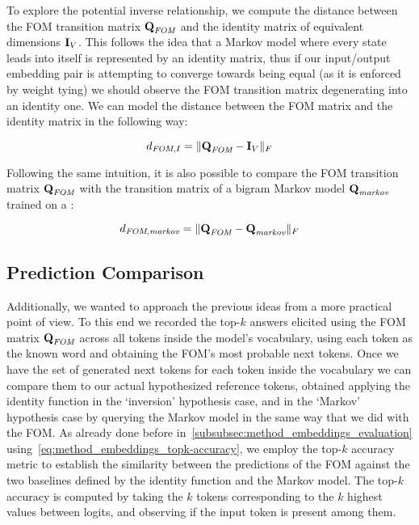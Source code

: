 To explore the potential inverse relationship, we compute the distance between the FOM transition matrix $\bm{\mathbf{Q}}_{\textit{FOM}}$ and the identity matrix of equivalent dimensions $\bm{\mathbf{I}}_V$.
This follows the idea that a Markov model where every state leads into itself is represented by an identity matrix, thus if our input/output embedding pair is attempting to converge towards being equal (as it is enforced by weight tying) we should observe the FOM transition matrix degenerating into an identity one.
We can model the distance between the FOM matrix and the identity matrix in the following way:

\begin{equation}
    \label{eq:method_fom_fom-i-comp}
    d_{\textit{FOM},I} = \| \bm{\mathbf{Q}}_{\textit{FOM}} - \bm{\mathbf{I}}_V \|_F
\end{equation}

Following the same intuition, it is also possible to compare the FOM transition matrix $\bm{\mathbf{Q}}_{\textit{FOM}}$ with the transition matrix of a bigram Markov model $\bm{\mathbf{Q}}_{\textit{markov}}$ trained on a :

\begin{equation}
    \label{eq:method_fom_fom-markov-comp}
    d_{\textit{FOM},\textit{markov}} = \| \bm{\mathbf{Q}}_{\textit{FOM}} - \bm{\mathbf{Q}}_{\textit{markov}} \|_F
\end{equation}

\subsection{Prediction Comparison}\label{ssec:method_fom_pred}

Additionally, we wanted to approach the previous ideas from a more practical point of view.
To this end we recorded the top-$k$ answers elicited using the FOM matrix $\bm{\mathbf{Q}}_{\textit{FOM}}$ across all tokens inside the model's vocabulary, using each token as the known word and obtaining the FOM's most probable next tokens.
Once we have the set of generated next tokens for each token inside the vocabulary we can compare them to our actual hypothesized reference tokens, obtained applying the identity function in the `inversion' hypothesis case, and in the `Markov' hypothesis case by querying the Markov model in the same way that we did with the FOM\@.
As already done before in~\cref{subsubsec:method_embeddings_evaluation} using~\cref{eq:method_embeddings_topk-accuracy}, we employ the top-$k$ accuracy metric to establish the similarity between the predictions of the FOM against the two baselines defined by the identity function and the Markov model.
The top-$k$ accuracy is computed by taking the $k$ tokens corresponding to the $k$ highest values between logits, and observing if the input token is present among them.

